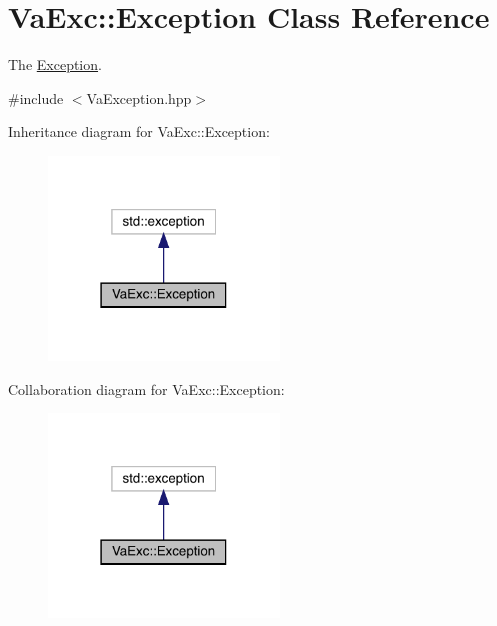 \hypertarget{class_va_exc_1_1_exception}{}\section{Va\+Exc\+:\+:Exception Class Reference}
\label{class_va_exc_1_1_exception}


The \hyperlink{class_va_exc_1_1_exception}{Exception}.  




{\ttfamily \#include $<$Va\+Exception.\+hpp$>$}



Inheritance diagram for Va\+Exc\+:\+:Exception\+:\nopagebreak
\begin{figure}[H]
\begin{center}
\leavevmode
\includegraphics[width=174pt]{class_va_exc_1_1_exception__inherit__graph}
\end{center}
\end{figure}


Collaboration diagram for Va\+Exc\+:\+:Exception\+:\nopagebreak
\begin{figure}[H]
\begin{center}
\leavevmode
\includegraphics[width=174pt]{class_va_exc_1_1_exception__coll__graph}
\end{center}
\end{figure}
